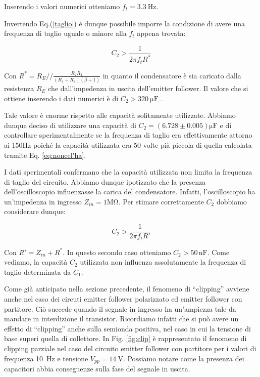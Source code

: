 Inserendo i valori numerici otteniamo $f_t=\SI{3.3}{\hertz}$.

Invertendo Eq.(\ref{taglio}) è dunque possibile imporre la condizione di avere una frequenza di taglio uguale o minore alla $f_t$ appena trovata: 

\begin{equation}
C_2>\frac{1}{2\pi f_t R^*}
\label{eq:noncel'ha}
\end{equation}

Con $R^*=R_E//\frac{R_2R_1}{(R_1+R_2)(\beta +1)}$ in quanto il condensatore è sia caricato dalla resistenza $R_E$ che dall'impedenza in uscita dell'emitter follower. Il valore che si ottiene inserendo i dati numerici è di $C_2>\SI{320}{\micro\farad}$
.

Tale valore è enorme rispetto alle capacità solitamente utilizzate. Abbiamo dunque deciso di utilizzare una capacità di $C_2=(6.728 \pm 0.005)\si{\micro\farad}$ e di controllare sperimentalmente se la frequenza di taglio era effettivamente attorno ai 150\si{\hertz} poiché la capacità utilizzata era 50 volte pià piccola di quella calcolata tramite Eq. \ref{eq:noncel'ha}.

I dati sperimentali confermano che la capacità utilizzata non limita la frequenza di taglio del circuito. Abbiamo dunque ipotizzato che la presenza dell'oscilloscopio influenzasse la carica del condensatore. Infatti, l'oscilloscopio ha un'impedenza in ingresso $Z_{in}=1\si{\mega\ohm}$. Per stimare correttamente $C_2$ dobbiamo considerare dunque: 

$$C_2>\frac{1}{2\pi f_t R'}$$

Con $R'=Z_{in}+R^*$. In questo secondo caso otteniamo $C_2>50\,\si{\nano\farad}$.
Come vediamo, la capacità $C_2$ utilizzata non influenza assolutamente la frequenza di taglio determinata da $C_1$. 


Come già anticipato nella sezione precedente, il fenomeno di ``clipping'' avviene anche nel caso dei circuti emitter follower polarizzato ed emitter follower con partitore.
Ciò succede quando il segnale in ingresso ha un'ampiezza tale da mandare in interdizione il transistor.
Ricordiamo infatti che si può avere un effetto di ``clipping'' anche sulla semionda positiva, nel caso in cui la tensione di base superi quella di collettore. 
In Fig. \ref{fig:clip} è rappresentato il fenomeno di clipping parziale nel caso del circuito emitter follower con partitore per i valori di frequenza \SI{10}{\hertz} e tensione $V_{pp} = \SI{14}{\volt}$. Possiamo notare come la presenza dei capacitori abbia conseguenze sulla fase del segnale in uscita.



